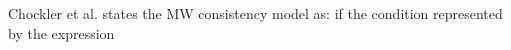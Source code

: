 \documentclass{sig-alternate-05-2015}
\begin{document}
  \par Chockler et al. states the MW consistency model as: if the condition represented by the expression
\end{document}
